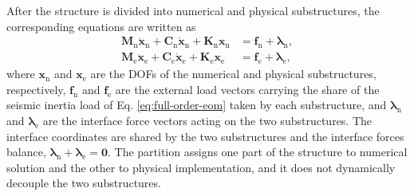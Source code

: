 \documentclass[a4paper,fleqn,review,12pt]{cas-sc}
\numberwithin{equation}{section}
\begin{document}
After the structure is divided into numerical and physical substructures, the corresponding equations are written as
\begin{subequations}
  \label{eq:substructure-eom}
  \begin{align}
    \mathbf{M}_{\mathrm{n}}\ddot{\bm{x}}_{\mathrm{n}}
    +\mathbf{C}_{\mathrm{n}}\dot{\bm{x}}_{\mathrm{n}}
    +\mathbf{K}_{\mathrm{n}}\bm{x}_{\mathrm{n}}
    &=\bm{f}_{\mathrm{n}}+\bm{\lambda}_{\mathrm{n}},
    \label{eq:numerical-eom}\\
    \mathbf{M}_{\mathrm{e}}\ddot{\bm{x}}_{\mathrm{e}}
    +\mathbf{C}_{\mathrm{e}}\dot{\bm{x}}_{\mathrm{e}}
    +\mathbf{K}_{\mathrm{e}}\bm{x}_{\mathrm{e}}
    &=\bm{f}_{\mathrm{e}}+\bm{\lambda}_{\mathrm{e}},
    \label{eq:physical-eom}
  \end{align}
\end{subequations}
where \(\bm{x}_{\mathrm{n}}\) and \(\bm{x}_{\mathrm{e}}\) are the DOFs of the numerical and physical substructures, respectively, \(\bm{f}_{\mathrm{n}}\) and \(\bm{f}_{\mathrm{e}}\) are the external load vectors carrying the share of the seismic inertia load of Eq. \eqref{eq:full-order-eom} taken by each substructure, and \(\bm{\lambda}_{\mathrm{n}}\) and \(\bm{\lambda}_{\mathrm{e}}\) are the interface force vectors acting on the two substructures. The interface coordinates are shared by the two substructures and the interface forces balance, \(\bm{\lambda}_{\mathrm{n}}+\bm{\lambda}_{\mathrm{e}}=\bm{0}\). The partition assigns one part of the structure to numerical solution and the other to physical implementation, and it does not dynamically decouple the two substructures.
\end{document}

